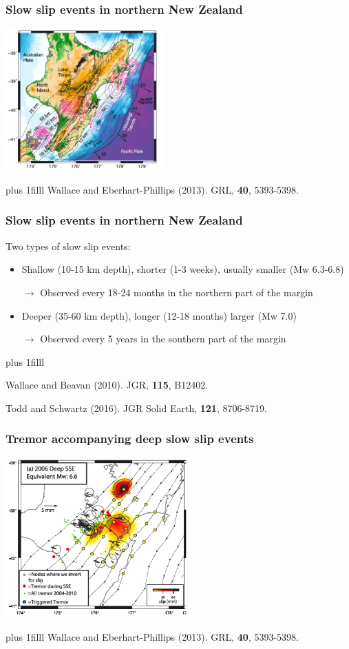 \documentclass{beamer}
\newcommand{\btVFill}{\vskip0pt plus 1filll}
\begin{document}
	\begin{frame}
		\frametitle{Slow slip events in northern New Zealand}
		\begin{center}
			\includegraphics[trim={0cm 0cm 0cm 0cm}, clip, width=6cm]{articles/wallace_eberhart-phillips_2013_1.png}
		\end{center}
		\btVFill
		\tiny{Wallace and Eberhart-Phillips (2013). GRL, \textbf{40}, 5393-5398.}
	\end{frame}

	\begin{frame}
		\frametitle{Slow slip events in northern New Zealand}

		\vspace{2em}

		Two types of slow slip events:
		\begin{itemize}
			\item  Shallow (10-15 km depth), shorter (1-3 weeks), usually smaller (Mw 6.3-6.8)

			$\rightarrow$ Observed every 18-24 months in the northern part of the margin

			\item Deeper (35-60 km depth), longer (12-18 months) larger (Mw 7.0)

			$\rightarrow$ Observed every 5 years in the southern part of the margin
		\end{itemize}
		\btVFill
		\tiny{Wallace and Beavan (2010). JGR, \textbf{115}, B12402.

		Todd and Schwartz (2016). JGR Solid Earth, \textbf{121}, 8706-8719.}
	\end{frame}

	\begin{frame}
		\frametitle{Tremor accompanying deep slow slip events}
		\begin{center}
			\includegraphics[trim={0cm 0cm 0cm 0cm}, clip, width=7cm]{articles/wallace_eberhart-phillips_2013_3a.png}
		\end{center}
		\btVFill
		\tiny{Wallace and Eberhart-Phillips (2013). GRL, \textbf{40}, 5393-5398.}
	\end{frame}
\end{document}

